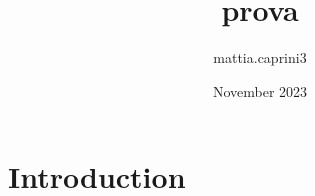 


\title{prova}
\author{mattia.caprini3}
\date{November 2023}
\maketitle


\section{Introduction}


